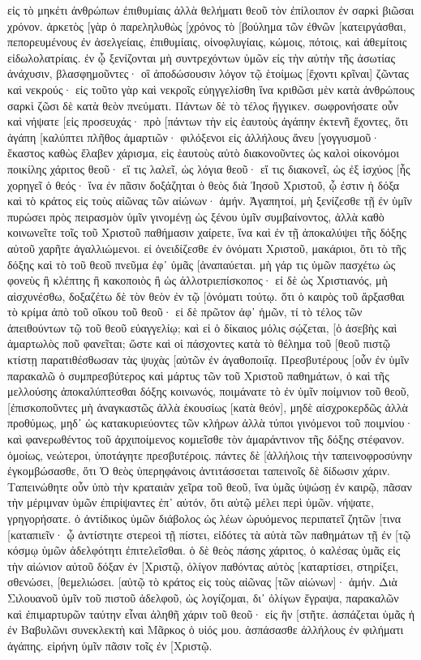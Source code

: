 εἰς τὸ μηκέτι ἀνθρώπων ἐπιθυμίαις ἀλλὰ θελήματι θεοῦ τὸν ἐπίλοιπον ἐν σαρκὶ βιῶσαι χρόνον. 
ἀρκετὸς [γὰρ ὁ παρεληλυθὼς [χρόνος τὸ [βούλημα τῶν ἐθνῶν [κατειργάσθαι, πεπορευμένους ἐν ἀσελγείαις, ἐπιθυμίαις, οἰνοφλυγίαις, κώμοις, πότοις, καὶ ἀθεμίτοις εἰδωλολατρίαις. 
ἐν ᾧ ξενίζονται μὴ συντρεχόντων ὑμῶν εἰς τὴν αὐτὴν τῆς ἀσωτίας ἀνάχυσιν, βλασφημοῦντες· 
οἳ ἀποδώσουσιν λόγον τῷ ἑτοίμως [ἔχοντι κρῖναι] ζῶντας καὶ νεκρούς· 
εἰς τοῦτο γὰρ καὶ νεκροῖς εὐηγγελίσθη ἵνα κριθῶσι μὲν κατὰ ἀνθρώπους σαρκὶ ζῶσι δὲ κατὰ θεὸν πνεύματι. 
Πάντων δὲ τὸ τέλος ἤγγικεν. σωφρονήσατε οὖν καὶ νήψατε [εἰς προσευχάς· 
πρὸ [πάντων τὴν εἰς ἑαυτοὺς ἀγάπην ἐκτενῆ ἔχοντες, ὅτι ἀγάπη [καλύπτει πλῆθος ἁμαρτιῶν· 
φιλόξενοι εἰς ἀλλήλους ἄνευ [γογγυσμοῦ· 
ἕκαστος καθὼς ἔλαβεν χάρισμα, εἰς ἑαυτοὺς αὐτὸ διακονοῦντες ὡς καλοὶ οἰκονόμοι ποικίλης χάριτος θεοῦ· 
εἴ τις λαλεῖ, ὡς λόγια θεοῦ· εἴ τις διακονεῖ, ὡς ἐξ ἰσχύος [ἧς χορηγεῖ ὁ θεός· ἵνα ἐν πᾶσιν δοξάζηται ὁ θεὸς διὰ Ἰησοῦ Χριστοῦ, ᾧ ἐστιν ἡ δόξα καὶ τὸ κράτος εἰς τοὺς αἰῶνας τῶν αἰώνων· ἀμήν. 
Ἀγαπητοί, μὴ ξενίζεσθε τῇ ἐν ὑμῖν πυρώσει πρὸς πειρασμὸν ὑμῖν γινομένῃ ὡς ξένου ὑμῖν συμβαίνοντος, 
ἀλλὰ καθὸ κοινωνεῖτε τοῖς τοῦ Χριστοῦ παθήμασιν χαίρετε, ἵνα καὶ ἐν τῇ ἀποκαλύψει τῆς δόξης αὐτοῦ χαρῆτε ἀγαλλιώμενοι. 
εἰ ὀνειδίζεσθε ἐν ὀνόματι Χριστοῦ, μακάριοι, ὅτι τὸ τῆς δόξης καὶ τὸ τοῦ θεοῦ πνεῦμα ἐφ᾽ ὑμᾶς [ἀναπαύεται. 
μὴ γάρ τις ὑμῶν πασχέτω ὡς φονεὺς ἢ κλέπτης ἢ κακοποιὸς ἢ ὡς ἀλλοτριεπίσκοπος· 
εἰ δὲ ὡς Χριστιανός, μὴ αἰσχυνέσθω, δοξαζέτω δὲ τὸν θεὸν ἐν τῷ [ὀνόματι τούτῳ. 
ὅτι ὁ καιρὸς τοῦ ἄρξασθαι τὸ κρίμα ἀπὸ τοῦ οἴκου τοῦ θεοῦ· εἰ δὲ πρῶτον ἀφ᾽ ἡμῶν, τί τὸ τέλος τῶν ἀπειθούντων τῷ τοῦ θεοῦ εὐαγγελίῳ; 
καὶ εἰ ὁ δίκαιος μόλις σῴζεται, [ὁ ἀσεβὴς καὶ ἁμαρτωλὸς ποῦ φανεῖται; 
ὥστε καὶ οἱ πάσχοντες κατὰ τὸ θέλημα τοῦ [θεοῦ πιστῷ κτίστῃ παρατιθέσθωσαν τὰς ψυχὰς [αὐτῶν ἐν ἀγαθοποιΐᾳ. 
Πρεσβυτέρους [οὖν ἐν ὑμῖν παρακαλῶ ὁ συμπρεσβύτερος καὶ μάρτυς τῶν τοῦ Χριστοῦ παθημάτων, ὁ καὶ τῆς μελλούσης ἀποκαλύπτεσθαι δόξης κοινωνός, 
ποιμάνατε τὸ ἐν ὑμῖν ποίμνιον τοῦ θεοῦ, [ἐπισκοποῦντες μὴ ἀναγκαστῶς ἀλλὰ ἑκουσίως [κατὰ θεόν], μηδὲ αἰσχροκερδῶς ἀλλὰ προθύμως, 
μηδ᾽ ὡς κατακυριεύοντες τῶν κλήρων ἀλλὰ τύποι γινόμενοι τοῦ ποιμνίου· 
καὶ φανερωθέντος τοῦ ἀρχιποίμενος κομιεῖσθε τὸν ἀμαράντινον τῆς δόξης στέφανον. 
ὁμοίως, νεώτεροι, ὑποτάγητε πρεσβυτέροις. πάντες δὲ [ἀλλήλοις τὴν ταπεινοφροσύνην ἐγκομβώσασθε, ὅτι Ὁ θεὸς ὑπερηφάνοις ἀντιτάσσεται ταπεινοῖς δὲ δίδωσιν χάριν. 
Ταπεινώθητε οὖν ὑπὸ τὴν κραταιὰν χεῖρα τοῦ θεοῦ, ἵνα ὑμᾶς ὑψώσῃ ἐν καιρῷ, 
πᾶσαν τὴν μέριμναν ὑμῶν ἐπιρίψαντες ἐπ᾽ αὐτόν, ὅτι αὐτῷ μέλει περὶ ὑμῶν. 
νήψατε, γρηγορήσατε. ὁ ἀντίδικος ὑμῶν διάβολος ὡς λέων ὠρυόμενος περιπατεῖ ζητῶν [τινα [καταπιεῖν· 
ᾧ ἀντίστητε στερεοὶ τῇ πίστει, εἰδότες τὰ αὐτὰ τῶν παθημάτων τῇ ἐν [τῷ κόσμῳ ὑμῶν ἀδελφότητι ἐπιτελεῖσθαι. 
ὁ δὲ θεὸς πάσης χάριτος, ὁ καλέσας ὑμᾶς εἰς τὴν αἰώνιον αὐτοῦ δόξαν ἐν [Χριστῷ, ὀλίγον παθόντας αὐτὸς [καταρτίσει, στηρίξει, σθενώσει, [θεμελιώσει. 
[αὐτῷ τὸ κράτος εἰς τοὺς αἰῶνας [τῶν αἰώνων]· ἀμήν. 
Διὰ Σιλουανοῦ ὑμῖν τοῦ πιστοῦ ἀδελφοῦ, ὡς λογίζομαι, δι᾽ ὀλίγων ἔγραψα, παρακαλῶν καὶ ἐπιμαρτυρῶν ταύτην εἶναι ἀληθῆ χάριν τοῦ θεοῦ· εἰς ἣν [στῆτε. 
ἀσπάζεται ὑμᾶς ἡ ἐν Βαβυλῶνι συνεκλεκτὴ καὶ Μᾶρκος ὁ υἱός μου. 
ἀσπάσασθε ἀλλήλους ἐν φιλήματι ἀγάπης. εἰρήνη ὑμῖν πᾶσιν τοῖς ἐν [Χριστῷ. 
